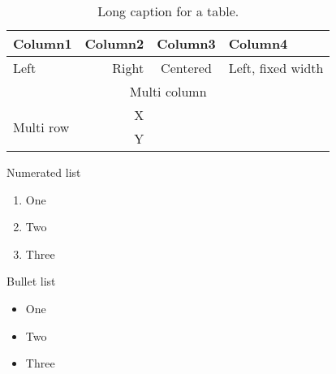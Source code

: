 \begin{table}[t]
    \caption[Short caption for list of tables]{Long caption for a table.}
    \label{tab:dummyTable}
    \centering \begin{adjustbox}{max width = \linewidth}
                   \begin{tabular}{lrcp{7cm}}
                       \toprule
                       Column1 & Column2 & Column3 & Column4 \\
                       \midrule
                       Left & Right & Centered & Left, fixed width \\
                       \multicolumn{4}{c}{Multi column} \\
                       \multirow{2}{*}{Multi row} & X & & \\
                       & Y & & \\
                       \bottomrule
                   \end{tabular}
    \end{adjustbox}
\end{table}

Numerated list
\begin{enumerate}
    \item One
    \item Two
    \item Three
\end{enumerate}

Bullet list
\begin{itemize}
    \item One
    \item Two
    \item Three
\end{itemize}